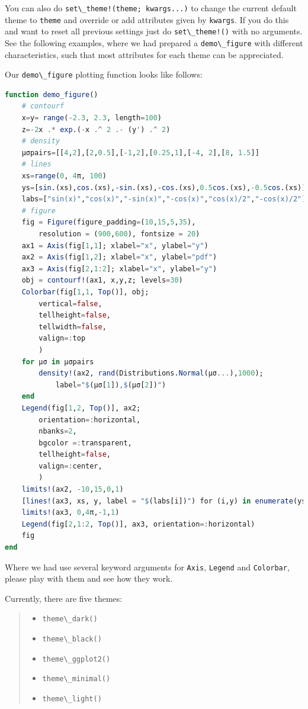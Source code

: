 \documentclass[
  notoc %
]{tufte-book}
\providecommand{\tightlist}{%
  \setlength{\itemsep}{0pt}\setlength{\parskip}{0pt}
}
\newcommand{\passthrough}[1]{#1}
\begin{document}
You can also do \passthrough{\lstinline"set\_theme!(theme; kwargs...)"}
to change the current default theme to \passthrough{\lstinline!theme!}
and override or add attributes given by
\passthrough{\lstinline!kwargs!}. If you do this and want to reset all
previous settings just do \passthrough{\lstinline"set\_theme!()"} with
no arguments. See the following examples, where we had prepared a
\passthrough{\lstinline!demo\_figure!} with different characteristics,
such that most attributes for each theme can be appreciated.

Our \passthrough{\lstinline!demo\_figure!} plotting function looks like
follows:

\begin{lstlisting}[language=Julia]
function demo_figure()
    # contourf
    x=y= range(-2.3, 2.3, length=100)
    z=-2x .* exp.(-x .^ 2 .- (y') .^ 2)
    # density
    μσpairs=[[4,2],[2,0.5],[-1,2],[0.25,1],[-4, 2],[8, 1.5]]
    # lines
    xs=range(0, 4π, 100)
    ys=[sin.(xs),cos.(xs),-sin.(xs),-cos.(xs),0.5cos.(xs),-0.5cos.(xs)]
    labs=["sin(x)","cos(x)","-sin(x)","-cos(x)","cos(x)/2","-cos(x)/2"]
    # figure
    fig = Figure(figure_padding=(10,15,5,35),
        resolution = (900,600), fontsize = 20)
    ax1 = Axis(fig[1,1]; xlabel="x", ylabel="y")
    ax2 = Axis(fig[1,2]; xlabel="x", ylabel="pdf")
    ax3 = Axis(fig[2,1:2]; xlabel="x", ylabel="y")
    obj = contourf!(ax1, x,y,z; levels=30)
    Colorbar(fig[1,1, Top()], obj;
        vertical=false,
        tellheight=false,
        tellwidth=false,
        valign=:top
        )
    for μσ in μσpairs
        density!(ax2, rand(Distributions.Normal(μσ...),1000);
            label="$(μσ[1]),$(μσ[2])")
    end
    Legend(fig[1,2, Top()], ax2;
        orientation=:horizontal,
        nbanks=2,
        bgcolor =:transparent,
        tellheight=false,
        valign=:center,
        )
    limits!(ax2, -10,15,0,1)
    [lines!(ax3, xs, y, label = "$(labs[i])") for (i,y) in enumerate(ys)]
    limits!(ax3, 0,4π,-1,1)
    Legend(fig[2,1:2, Top()], ax3, orientation=:horizontal)
    fig
end
\end{lstlisting}

Where we had use several keyword arguments for
\passthrough{\lstinline!Axis!}, \passthrough{\lstinline!Legend!} and
\passthrough{\lstinline!Colorbar!}, please play with them and see how
they work.

Currently, there are five themes:

\begin{quote}
\begin{itemize}
\tightlist
\item
  \passthrough{\lstinline!theme\_dark()!}
\item
  \passthrough{\lstinline!theme\_black()!}
\item
  \passthrough{\lstinline!theme\_ggplot2()!}
\item
  \passthrough{\lstinline!theme\_minimal()!}
\item
  \passthrough{\lstinline!theme\_light()!}
\end{itemize}
\end{quote}
\end{document}
